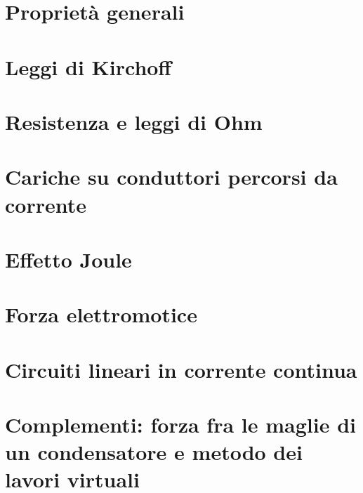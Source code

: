 \section{Proprietà generali}


\section{Leggi di Kirchoff}


\section{Resistenza e leggi di Ohm}


\section{Cariche su conduttori percorsi da corrente}


\section{Effetto Joule}


\section{Forza elettromotice}


\section{Circuiti lineari in corrente continua}


\section{Complementi: forza fra le maglie di un condensatore e metodo dei lavori virtuali}

